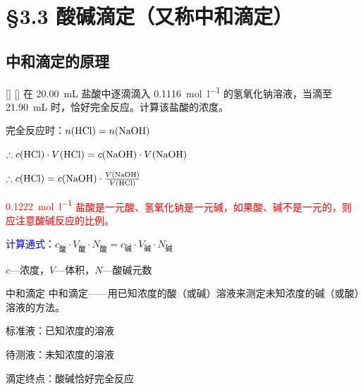 \section{\S 3.3 酸碱滴定\texorpdfstring{（又称中和滴定）}{}}\label{sect:酸碱滴定}

    \subsection{中和滴定的原理}\label{subsec:中和滴定的原理}

        \begin{xmp}
            [中和滴定计算例题]
            {}
            []
            []
            在 \SI{20.00}{mL} 盐酸中逐滴滴入 \SI{0.1116}{\mole\per\litre} 的氢氧化钠溶液，当滴至 \SI{21.90}{mL} 时，恰好完全反应。计算该盐酸的浓度。

            \vspace{0.5\baselineskip}
            \begin{minipage}{0.55\textwidth}

            
                完全反应时：\(n(\cemh{HCl}) = n(\cemh{NaOH})\)

                \(\therefore c(\cemh{HCl})\cdot V(\cemh{HCl}) = c(\cemh{NaOH}) \cdot V(\cemh{NaOH})\)

                \(\therefore c(\cemh{HCl}) = c(\cemh{NaOH})\cdot\frac{V(\cemh{NaOH})}{V(\cemh{HCl})}\)
            \end{minipage}
            \hfil
            \begin{minipage}{0.35\textwidth}
                \hfil\textcolor{red}{\SI{0.1222}{\mole\per\litre}}
                \newline
                \newline
                \textcolor{red}{盐酸是一元酸、氢氧化钠是一元碱，如果酸、碱不是一元的，则应注意酸碱反应的比例。}
            \end{minipage}
        \end{xmp}

        \textcolor{blue}{计算通式：}\(c_\text{酸}\cdot V_\text{酸}\cdot N_\text{酸}=c_\text{碱}\cdot V_\text{碱}\cdot N_\text{碱}\)

        \(c\)—浓度，\(V\)—体积，\(N\)—酸碱元数

        \begin{dfn}{中和滴定}
            中和滴定——用已知浓度的酸（或碱）溶液来测定未知浓度的碱（或酸）溶液的方法。

            标准液：已知浓度的溶液

            待测液：未知浓度的溶液

            滴定终点：酸碱恰好完全反应
        \end{dfn}

